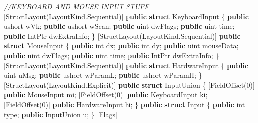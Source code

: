 \documentclass[
  openany]{book}
\newenvironment{Shaded}{\begin{snugshade}}{\end{snugshade}}
\newcommand{\CommentTok}[1]{\textcolor[rgb]{0.56,0.35,0.01}{\textit{#1}}}
\newcommand{\DataTypeTok}[1]{\textcolor[rgb]{0.13,0.29,0.53}{#1}}
\newcommand{\DecValTok}[1]{\textcolor[rgb]{0.00,0.00,0.81}{#1}}
\newcommand{\FunctionTok}[1]{\textcolor[rgb]{0.00,0.00,0.00}{#1}}
\newcommand{\KeywordTok}[1]{\textcolor[rgb]{0.13,0.29,0.53}{\textbf{#1}}}
\newcommand{\NormalTok}[1]{#1}
\begin{document}
\begin{Shaded}
\begin{Highlighting}[]
        \CommentTok{//KEYBOARD AND MOUSE INPUT STUFF}
\NormalTok{        [}\FunctionTok{StructLayout}\NormalTok{(LayoutKind.}\FunctionTok{Sequential}\NormalTok{)]}
        \KeywordTok{public} \KeywordTok{struct}\NormalTok{ KeyboardInput}
\NormalTok{        \{}
            \KeywordTok{public} \DataTypeTok{ushort}\NormalTok{ wVk;}
            \KeywordTok{public} \DataTypeTok{ushort}\NormalTok{ wScan;}
            \KeywordTok{public} \DataTypeTok{uint}\NormalTok{ dwFlags;}
            \KeywordTok{public} \DataTypeTok{uint}\NormalTok{ time;}
            \KeywordTok{public}\NormalTok{ IntPtr dwExtraInfo;}
\NormalTok{        \}}
\NormalTok{        [}\FunctionTok{StructLayout}\NormalTok{(LayoutKind.}\FunctionTok{Sequential}\NormalTok{)]}
        \KeywordTok{public} \KeywordTok{struct}\NormalTok{ MouseInput}
\NormalTok{        \{}
            \KeywordTok{public} \DataTypeTok{int}\NormalTok{ dx;}
            \KeywordTok{public} \DataTypeTok{int}\NormalTok{ dy;}
            \KeywordTok{public} \DataTypeTok{uint}\NormalTok{ mouseData;}
            \KeywordTok{public} \DataTypeTok{uint}\NormalTok{ dwFlags;}
            \KeywordTok{public} \DataTypeTok{uint}\NormalTok{ time;}
            \KeywordTok{public}\NormalTok{ IntPtr dwExtraInfo;}
\NormalTok{        \}}
\NormalTok{        [}\FunctionTok{StructLayout}\NormalTok{(LayoutKind.}\FunctionTok{Sequential}\NormalTok{)]}
        \KeywordTok{public} \KeywordTok{struct}\NormalTok{ HardwareInput}
\NormalTok{        \{}
            \KeywordTok{public} \DataTypeTok{uint}\NormalTok{ uMsg;}
            \KeywordTok{public} \DataTypeTok{ushort}\NormalTok{ wParamL;}
            \KeywordTok{public} \DataTypeTok{ushort}\NormalTok{ wParamH;}
\NormalTok{        \}}
\NormalTok{        [}\FunctionTok{StructLayout}\NormalTok{(LayoutKind.}\FunctionTok{Explicit}\NormalTok{)]}
        \KeywordTok{public} \KeywordTok{struct}\NormalTok{ InputUnion}
\NormalTok{        \{}
\NormalTok{            [}\FunctionTok{FieldOffset}\NormalTok{(}\DecValTok{0}\NormalTok{)] }\KeywordTok{public}\NormalTok{ MouseInput mi;}
\NormalTok{            [}\FunctionTok{FieldOffset}\NormalTok{(}\DecValTok{0}\NormalTok{)] }\KeywordTok{public}\NormalTok{ KeyboardInput ki;}
\NormalTok{            [}\FunctionTok{FieldOffset}\NormalTok{(}\DecValTok{0}\NormalTok{)] }\KeywordTok{public}\NormalTok{ HardwareInput hi;}
\NormalTok{        \}}
        \KeywordTok{public} \KeywordTok{struct}\NormalTok{ Input}
\NormalTok{        \{}
            \KeywordTok{public} \DataTypeTok{int}\NormalTok{ type;}
            \KeywordTok{public}\NormalTok{ InputUnion u;}
\NormalTok{        \}}
\NormalTok{        [Flags]}

\end{Highlighting}
\end{Shaded}
\end{document}
